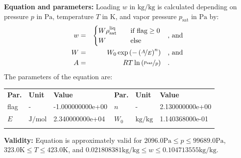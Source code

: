 \textbf{Equation and parameters:}
\newline
%
Loading $w$ in $\si{\kilogram\per\kilogram}$ is calculated depending on pressure $p$ in $\si{\pascal}$, temperature $T$ in $\si{\kelvin}$, and vapor pressure $p_\mathrm{sat}$ in $\si{\pascal}$ by:
%
\begin{equation*}
\begin{split}
w &=& \begin{cases} W \rho_\mathrm{sat}^{\mathrm{liq}} & \quad \text{if flag} \geq 0 \\ W & \quad \text{else} \end{cases} & \quad\text{, and} \\
W &=& W_0 \exp \left( - \left( \nicefrac{A}{E} \right) ^{n} \right) & \quad\text{, and} \\
A &=& R T \ln \left( \nicefrac{p_\mathrm{sat}}{p} \right) & \quad\text{.} \\
\end{split}
\end{equation*}
%
The parameters of the equation are:
%
\begin{longtable}[l]{lll|lll}
\toprule
\addlinespace
\textbf{Par.} & \textbf{Unit} & \textbf{Value} &	\textbf{Par.} & \textbf{Unit} & \textbf{Value} \\
\addlinespace
\midrule
\endhead

\bottomrule
\endfoot
\bottomrule
\endlastfoot
\addlinespace

flag & - & -1.000000000e+00 & $n$ & - & 2.130000000e+00 \\
$E$ & $\si{\joule\per\mole}$ & 2.340000000e+04 & $W_0$ & $\si{\kilogram\per\kilogram}$ & 1.140368000e-01 \\

\addlinespace\end{longtable}

\textbf{Validity:}
\newline
Equation is approximately valid for $2096.0 \si{\pascal} \leq p \leq 99689.0 \si{\pascal}$,  $323.0 \si{\kelvin} \leq T \leq 423.0 \si{\kelvin}$, and $0.021808381 \si{\kilogram\per\kilogram} \leq w \leq 0.104713555 \si{\kilogram\per\kilogram}$.
\newline

